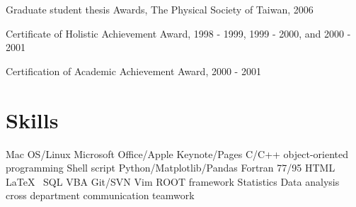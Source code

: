 \documentclass[letterpaper]{deedy-resume-openfont}
\begin{document}
\begin{tightemize}
\item \href{https://hdl.handle.net/11244/299774}{\color{link}{Dissertation link}}
\end{tightemize}
\sectionsep

\begin{tightemize}
\item \href{http://www.airitilibrary.com/Publication/alDetailedMesh1?DocID=U0001-1407200616551200}{\color{link}{Thesis link}}
\item Graduate student thesis Awards, The Physical Society of Taiwan, 2006
\end{tightemize}
\sectionsep

\begin{tightemize}
\item Certificate of Holistic Achievement Award, 1998 - 1999, 1999 - 2000, and 2000 - 2001
\item Certification of Academic Achievement Award, 2000 - 2001
\end{tightemize}
\sectionsep


\section{Skills}
Mac OS/Linux \textbullet{} Microsoft Office/Apple Keynote/Pages \textbullet{} C/C++ \textbullet{} object-oriented programming \textbullet{} Shell script \textbullet{} Python/Matplotlib/Pandas \textbullet{} Fortran 77/95 \textbullet{} HTML \textbullet{} \LaTeX\ \textbullet{} SQL \textbullet{} VBA \textbullet{} Git/SVN \textbullet{} Vim \textbullet{} ROOT framework \textbullet{} Statistics \textbullet{} Data analysis \textbullet{} cross department communication \textbullet{} teamwork\\
\sectionsep
\end{document}
